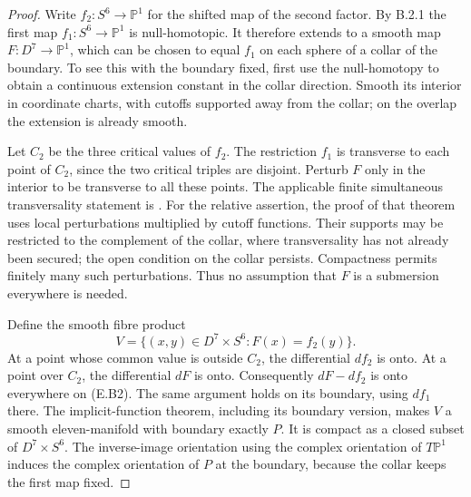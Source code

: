 \begin{proof}
Write $f_2:S^6\to\mathbb P^1$ for the shifted map of the second
factor. By B.2.1 the first map $f_1:S^6\to\mathbb P^1$ is
null-homotopic. It therefore extends to a smooth map
$F:D^7\to\mathbb P^1$, which can be chosen to equal $f_1$ on
each sphere of a collar of the boundary. To see this with the
boundary fixed, first use the null-homotopy to obtain a continuous
extension constant in the collar direction. Smooth its interior
in coordinate charts, with cutoffs supported away from the collar;
on the overlap the extension is already smooth.

Let $C_2$ be the three critical values of $f_2$. The restriction
$f_1$ is transverse to each point of $C_2$, since the two critical
triples are disjoint. Perturb $F$ only in the interior to be
transverse to all these points. The applicable finite simultaneous
transversality statement is
\cite[Chapter 3, Section 2, Theorems 2.1 and 2.5]{rootHirsch76}.
For the relative assertion, the proof of that theorem uses local
perturbations multiplied by cutoff functions. Their supports may
be restricted to the complement of the collar, where
transversality has not already been secured; the open condition
on the collar persists. Compactness permits finitely many such
perturbations. Thus no assumption that $F$ is a submersion
everywhere is needed.

Define the smooth fibre product
\[
 V=\{(x,y)\in D^7\times S^6:F(x)=f_2(y)\}.
 \tag{E.B2}
\]
At a point whose common value is outside $C_2$, the differential
$df_2$ is onto. At a point over $C_2$, the differential $dF$ is
onto. Consequently $dF-df_2$ is onto everywhere on (E.B2).
The same argument holds on its boundary, using $df_1$ there.
The implicit-function theorem, including its boundary version,
makes $V$ a smooth eleven-manifold with boundary exactly $P$.
It is compact as a closed subset of $D^7\times S^6$.
The inverse-image orientation using the complex orientation of
$T\mathbb P^1$ induces the complex orientation of $P$ at the
boundary, because the collar keeps the first map fixed.


\end{proof}
